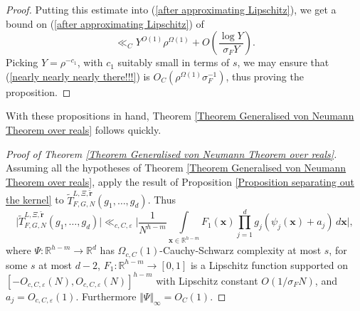 \documentclass[12pt,a4paper,twoside,reqno]{amsart}
\numberwithin{equation}{section}
\begin{document}
\begin{proof}
Putting this estimate into (\ref{after approximating Lipschitz}), we get a bound on (\ref{after approximating Lipschitz}) of 
\begin{equation}
\label{nearly nearly nearly there!!!}
\ll_C Y^{O(1)} \rho^{\Omega(1)}  + O(\frac{\log Y}{\sigma_F Y}).
\end{equation}
\noindent Picking $Y = \rho^{-c_1}$, with $c_1$ suitably small in terms of $s$, we may ensure that (\ref{nearly nearly nearly there!!!}) is $O_C(\rho^{\Omega(1)} \sigma_F^{-1})$, thus proving the proposition. 
\end{proof}
With these propositions in hand, Theorem \ref{Theorem Generalised von Neumann Theorem over reals} follows quickly. 
\begin{proof}[Proof of Theorem \ref{Theorem Generalised von Neumann Theorem over reals}]
Assuming all the hypotheses of Theorem \ref{Theorem Generalised von Neumann Theorem over reals}, apply the result of Proposition \ref{Proposition separating out the kernel} to $\widetilde{T}_{F,G,N}^{L,\Xi,\widetilde{\mathbf{r}}}(g_1,\dots,g_d)$. Thus 
\begin{equation}
\label{applying the first proposition chapter 3}
\vert\widetilde{T}_{F,G,N}^{L,\Xi,\widetilde{\mathbf{r}}}(g_1,\dots,g_d)\vert\ll_{c,C,\varepsilon} \Big\vert\frac{1}{N^{h-m}} \int\limits_{\mathbf{x} \in\mathbb{R}^{h-m}}  F_1(\mathbf{x})\prod\limits_{j=1}^d g_j(\psi_j(\mathbf{x}) +a_j) \, d\mathbf{x}\Big\vert,
\end{equation} where $\Psi: \mathbb{R}^{h-m} \longrightarrow \mathbb{R}^d$ has $\Omega_{c,C}(1)$-Cauchy-Schwarz complexity at most $s$, for some $s$ at most $d-2$, $F_1:\mathbb{R}^{h-m} \longrightarrow [0,1]$ is a Lipschitz function supported on $[-O_{c,C,\varepsilon}(N),O_{c,C,\varepsilon}(N)]^{h-m}$ with Lipschitz constant $O(1/\sigma_F N)$, and $a_j = O_{c,C,\varepsilon}(1)$. Furthermore $\Vert \Psi\Vert_\infty = O_C(1)$.


\end{proof}
\end{document}
